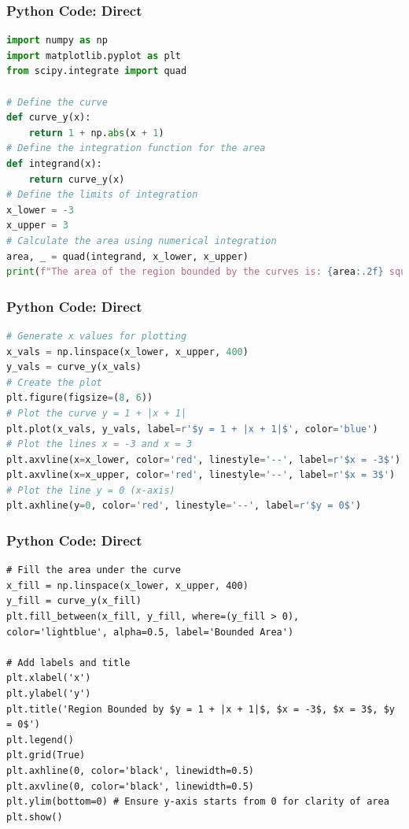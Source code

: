 \documentclass{beamer}
\begin{document}
\begin{frame}[fragile]
\frametitle{Python Code: Direct}
\begin{lstlisting}[language=Python]
import numpy as np
import matplotlib.pyplot as plt
from scipy.integrate import quad

# Define the curve
def curve_y(x):
    return 1 + np.abs(x + 1)
# Define the integration function for the area
def integrand(x):
    return curve_y(x)
# Define the limits of integration
x_lower = -3
x_upper = 3
# Calculate the area using numerical integration
area, _ = quad(integrand, x_lower, x_upper)
print(f"The area of the region bounded by the curves is: {area:.2f} square units")
\end{lstlisting}
\end{frame}

\begin{frame}[fragile]
\frametitle{Python Code: Direct}
\begin{lstlisting}[language=Python]
# Generate x values for plotting
x_vals = np.linspace(x_lower, x_upper, 400)
y_vals = curve_y(x_vals)
# Create the plot
plt.figure(figsize=(8, 6))
# Plot the curve y = 1 + |x + 1|
plt.plot(x_vals, y_vals, label=r'$y = 1 + |x + 1|$', color='blue')
# Plot the lines x = -3 and x = 3
plt.axvline(x=x_lower, color='red', linestyle='--', label=r'$x = -3$')
plt.axvline(x=x_upper, color='red', linestyle='--', label=r'$x = 3$')
# Plot the line y = 0 (x-axis)
plt.axhline(y=0, color='red', linestyle='--', label=r'$y = 0$')
\end{lstlisting}
\end{frame}

\begin{frame}[fragile]
\frametitle{Python Code: Direct}
\begin{lstlisting}
# Fill the area under the curve
x_fill = np.linspace(x_lower, x_upper, 400)
y_fill = curve_y(x_fill)
plt.fill_between(x_fill, y_fill, where=(y_fill > 0), color='lightblue', alpha=0.5, label='Bounded Area')

# Add labels and title
plt.xlabel('x')
plt.ylabel('y')
plt.title('Region Bounded by $y = 1 + |x + 1|$, $x = -3$, $x = 3$, $y = 0$')
plt.legend()
plt.grid(True)
plt.axhline(0, color='black', linewidth=0.5)
plt.axvline(0, color='black', linewidth=0.5)
plt.ylim(bottom=0) # Ensure y-axis starts from 0 for clarity of area
plt.show()
\end{lstlisting}
\end{frame}
\end{document}
